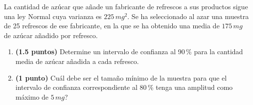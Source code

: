 
La cantidad de azúcar que añade un fabricante de refrescos a sus productos
sigue una ley Normal cuya varianza es $225\,mg^2$. Se ha seleccionado al
azar una muestra de 25 refrescos de ese fabricante, en la que se ha obtenido
una media de $175\,mg$ de azúcar añadido por refresco.

\begin{enumerate}[label=\alph*)]
  \item \textbf{(1.5 puntos)} Determine un intervalo de confianza al 90\,\%
  para la cantidad media de azúcar añadida a cada refresco.
  \item \textbf{(1 punto)} \textquestiondown{}Cuál debe ser el tamaño mínimo
  de la muestra para que el intervalo de confianza correspondiente al
  80\,\% tenga una amplitud como máximo de $5\,mg$?
\end{enumerate}
